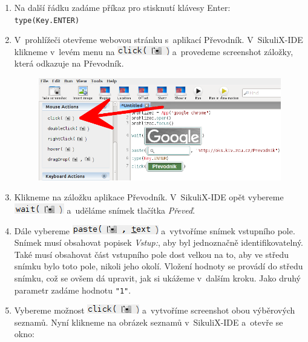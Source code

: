\begin{enumerate}
\begin{figure}[ht!]
					\end{figure}
					\FloatBarrier
				\item Na další řádku zadáme příkaz pro stisknutí klávesy Enter:\\\texttt{type(Key.ENTER)}
				\item V~prohlížeči otevřeme webovou stránku s~aplikací Převodník. V~SikuliX-IDE klikneme v~levém menu na \includegraphics[scale=0.7]{img/PrvniSkript/click.png} a~provedeme screenshot záložky, která odkazuje na Převodník.
					\begin{figure}[ht!]
						\centering
						\includegraphics[width=12.5cm]{img/PrvniSkript/krok7.png}
					\end{figure}
					\FloatBarrier
				\item Klikneme na záložku aplikace Převodník. V~SikuliX-IDE opět vybereme \includegraphics[scale=0.7]{img/PrvniSkript/wait.png} a~uděláme snímek tlačítka \emph{Převeď}.
				\item Dále vybereme \includegraphics[scale=0.7]{img/PrvniSkript/paste.png} a~vytvoříme snímek vstupního pole. Snímek musí obsahovat popisek \emph{Vstup:}, aby byl jednoznačně identifikovatelný. Také musí obsahovat část vstupního pole dost velkou na to, aby ve středu snímku bylo toto pole, nikoli jeho okolí. Vložení hodnoty se provádí do středu snímku, což se ovšem dá upravit, jak si ukážeme v~dalším kroku. Jako druhý parametr zadáme hodnotu \texttt{"1"}.
				\item Vybereme možnost \includegraphics[scale=0.7]{img/PrvniSkript/click.png} a~vytvoříme screenshot obou výběrových seznamů. Nyní klikneme na obrázek seznamů v~SikuliX-IDE a~otevře se okno:

\end{enumerate}
